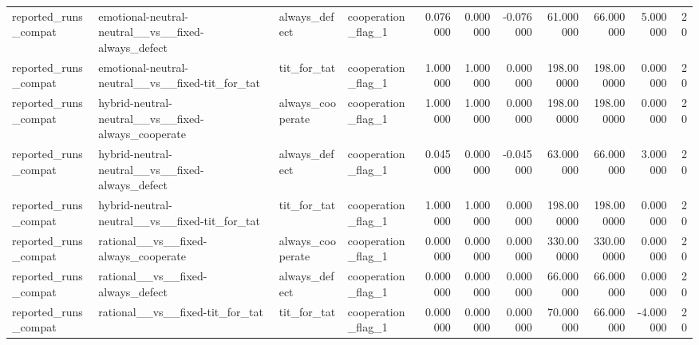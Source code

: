 \begin{tabular}{llllrrrrrrr}
reported\_runs\_compat & emotional-neutral-neutral\_\_vs\_\_fixed-always\_defect & always\_defect & cooperation\_flag\_1 & 0.076000 & 0.000000 & -0.076000 & 61.000000 & 66.000000 & 5.000000 & 20 \\
reported\_runs\_compat & emotional-neutral-neutral\_\_vs\_\_fixed-tit\_for\_tat & tit\_for\_tat & cooperation\_flag\_1 & 1.000000 & 1.000000 & 0.000000 & 198.000000 & 198.000000 & 0.000000 & 20 \\
reported\_runs\_compat & hybrid-neutral-neutral\_\_vs\_\_fixed-always\_cooperate & always\_cooperate & cooperation\_flag\_1 & 1.000000 & 1.000000 & 0.000000 & 198.000000 & 198.000000 & 0.000000 & 20 \\
reported\_runs\_compat & hybrid-neutral-neutral\_\_vs\_\_fixed-always\_defect & always\_defect & cooperation\_flag\_1 & 0.045000 & 0.000000 & -0.045000 & 63.000000 & 66.000000 & 3.000000 & 20 \\
reported\_runs\_compat & hybrid-neutral-neutral\_\_vs\_\_fixed-tit\_for\_tat & tit\_for\_tat & cooperation\_flag\_1 & 1.000000 & 1.000000 & 0.000000 & 198.000000 & 198.000000 & 0.000000 & 20 \\
reported\_runs\_compat & rational\_\_vs\_\_fixed-always\_cooperate & always\_cooperate & cooperation\_flag\_1 & 0.000000 & 0.000000 & 0.000000 & 330.000000 & 330.000000 & 0.000000 & 20 \\
reported\_runs\_compat & rational\_\_vs\_\_fixed-always\_defect & always\_defect & cooperation\_flag\_1 & 0.000000 & 0.000000 & 0.000000 & 66.000000 & 66.000000 & 0.000000 & 20 \\
reported\_runs\_compat & rational\_\_vs\_\_fixed-tit\_for\_tat & tit\_for\_tat & cooperation\_flag\_1 & 0.000000 & 0.000000 & 0.000000 & 70.000000 & 66.000000 & -4.000000 & 20 \\
\bottomrule
\end{tabular}
